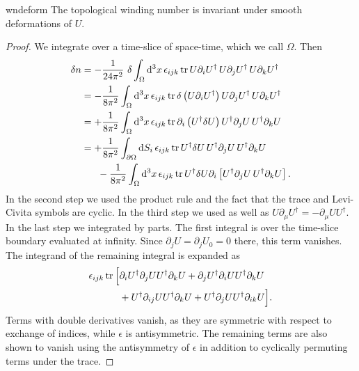 \begin{theorem}{}{wndeform}
The topological winding number is invariant under smooth
deformations of $U$.
\begin{proof} We integrate  over a time-slice of space-time,
which we call $\Omega$. Then
  \begin{align*}
   \var n &=-\frac{1}{24\pi^2}~\var\int_\Omega\dd[3]{x}\epsilon_{ijk}\tr
                U\partial_iU^\dagger\,
                U\partial_jU^\dagger\,
                U\partial_kU^\dagger\\
            &=-\frac{1}{8\pi^2}\int_\Omega \dd[3]{x}\epsilon_{ijk}\tr
                \var\left(U\partial_iU^\dagger\right)
                            U\partial_jU^\dagger\,
                            U\partial_kU^\dagger\\
            &=+\frac{1}{8\pi^2}\int_\Omega \dd[3]{x}\epsilon_{ijk}\tr
                \partial_i\left(U^\dagger\var U\right)
                 U^\dagger\partial_jU\,
                 U^\dagger\partial_kU\\
            &=+\frac{1}{8\pi^2}\int_{\partial\Omega} \dd{S_i}\epsilon_{ijk}\tr
                U^\dagger\var U\,
                U^\dagger\partial_j U\,
                U^\dagger\partial_k U\\
            &~~~~~-\frac{1}{8\pi^2}\int_\Omega \dd[3]{x}\epsilon_{ijk}\tr
                U^\dagger\var U\partial_i\left[
                U^\dagger\partial_j U\,
                U^\dagger\partial_k U\right].
  \end{align*}
  In the second step we used the product rule and the fact that the trace 
  and Levi-Civita symbols are cyclic.
  In the third step we used  as well as
  $U\partial_\mu U^\dagger=-\partial_\mu UU^\dagger$. In the last step
  we integrated by parts. The first integral is over the time-slice boundary
  evaluated at infinity. Since $\partial_jU=\partial_jU_0=0$ there, this term
  vanishes. The integrand of the remaining integral is expanded as
  \begin{equation*}\begin{aligned}
    \epsilon_{ijk}\tr\Big[&
     \partial_i U^\dagger\partial_j U U^\dagger\partial_k U
     +\partial_j U^\dagger\partial_i U U^\dagger\partial_k U\\
     &+U^\dagger\partial_{ij}UU^\dagger\partial_k U
     +U^\dagger\partial_jUU^\dagger\partial_{ik}U\Big].
  \end{aligned}\end{equation*}
  Terms with double derivatives vanish, as they are symmetric with respect
  to exchange of indices, while $\epsilon$ is antisymmetric. The remaining
  terms are also shown to vanish using the antisymmetry of $\epsilon$
  in addition to cyclically permuting terms under the trace.
\end{proof}
\end{theorem}

